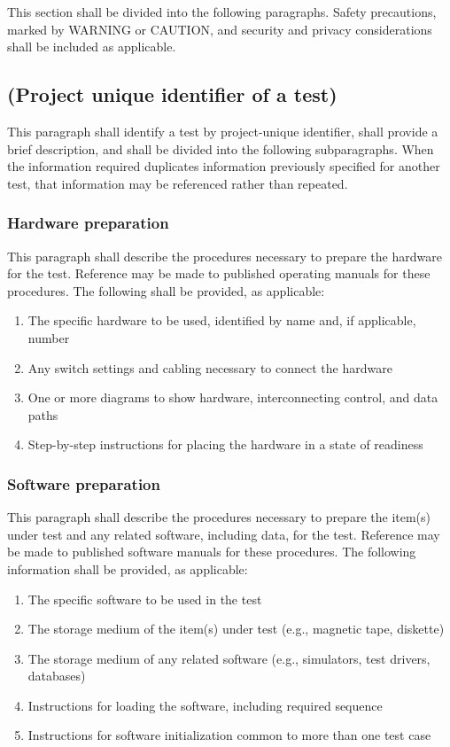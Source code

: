 This section shall be divided into the following paragraphs. Safety
precautions, marked by WARNING or CAUTION, and security and privacy
considerations shall be included as applicable.

\subsection{(Project unique identifier of a test)}

This paragraph shall identify a test by project-unique identifier, shall
provide a brief description, and shall be divided into the following
subparagraphs. When the information required duplicates information
previously specified for another test, that information may be
referenced rather than repeated.

\subsubsection{Hardware preparation}

This paragraph shall describe the procedures necessary to prepare the
hardware for the test. Reference may be made to published operating
manuals for these procedures. The following shall be provided, as
applicable:

\begin{enumerate}
\itemsep1pt\parskip0pt
\item
  The specific hardware to be used, identified by name and, if
  applicable, number
\item
  Any switch settings and cabling necessary to connect the hardware
\item
  One or more diagrams to show hardware, interconnecting control, and
  data paths
\item
  Step-by-step instructions for placing the hardware in a state of
  readiness
\end{enumerate}

\subsubsection{Software preparation}

This paragraph shall describe the procedures necessary to prepare the
item(s) under test and any related software, including data, for the
test. Reference may be made to published software manuals for these
procedures. The following information shall be provided, as applicable:

\begin{enumerate}
\itemsep1pt\parskip0pt
\item
  The specific software to be used in the test
\item
  The storage medium of the item(s) under test (e.g., magnetic tape,
  diskette)
\item
  The storage medium of any related software (e.g., simulators, test
  drivers, databases)
\item
  Instructions for loading the software, including required sequence
\item
  Instructions for software initialization common to more than one test
  case
\end{enumerate}

